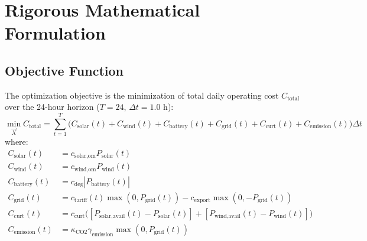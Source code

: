 \documentclass[journal,10pt,twocolumn]{IEEEtran}
\begin{document}
\section{Rigorous Mathematical Formulation}

\subsection{Objective Function}
The optimization objective is the minimization of total daily operating cost $C_{\text{total}}$ over the 24-hour horizon ($T=24$, $\Delta t=1.0$ h):
\begin{equation}
\min_{\vec{X}} C_{\text{total}} = \sum_{t=1}^{T} \Big( C_{\text{solar}}(t) + C_{\text{wind}}(t) + C_{\text{battery}}(t) + C_{\text{grid}}(t) + C_{\text{curt}}(t) + C_{\text{emission}}(t) \Big) \Delta t
\end{equation}
where:
\begin{align}
C_{\text{solar}}(t) &= c_{\text{solar,om}} P_{\text{solar}}(t) \\
C_{\text{wind}}(t) &= c_{\text{wind,om}} P_{\text{wind}}(t) \\
C_{\text{battery}}(t) &= c_{\text{deg}} |P_{\text{battery}}(t)| \\
C_{\text{grid}}(t) &= c_{\text{tariff}}(t) \max(0, P_{\text{grid}}(t)) - c_{\text{export}} \max(0, -P_{\text{grid}}(t)) \\
C_{\text{curt}}(t) &= c_{\text{curt}} \Big( [P_{\text{solar,avail}}(t) - P_{\text{solar}}(t)] + [P_{\text{wind,avail}}(t) - P_{\text{wind}}(t)] \Big) \\
C_{\text{emission}}(t) &= \kappa_{\text{CO2}} \gamma_{\text{emission}} \max(0, P_{\text{grid}}(t))
\end{align}
\end{document}

